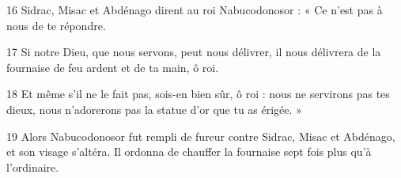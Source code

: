 
16 Sidrac, Misac et Abdénago dirent au roi Nabucodonosor : « Ce n’est pas à nous de te répondre.

17 Si notre Dieu, que nous servons, peut nous délivrer, il nous délivrera de la fournaise de feu ardent et de ta main, ô roi.

18 Et même s’il ne le fait pas, sois-en bien sûr, ô roi : nous ne servirons pas tes dieux, nous n’adorerons pas la statue d’or que tu as érigée. »

19 Alors Nabucodonosor fut rempli de fureur contre Sidrac, Misac et Abdénago, et son visage s’altéra. Il ordonna de chauffer la fournaise sept fois plus qu’à l’ordinaire.
